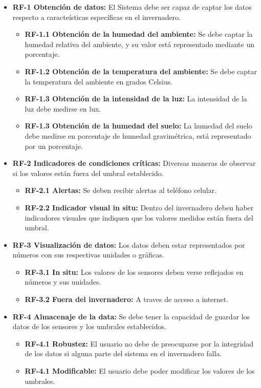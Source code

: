 \begin{itemize}
    \item \textbf{RF-1 Obtención de datos:} El Sistema debe ser capaz de captar los datos respecto a caracteísticas específicas en el invernadero.
    \begin{itemize}
        \item \textbf{RF-1.1 Obtención de la humedad del ambiente:} Se debe captar la humedad relativa del ambiente, y su valor está representado mediante un porcentaje. 
        \item \textbf{RF-1.2 Obtención de la temperatura del ambiente:} Se debe captar la temperatura del ambiente en grados Celsius. 
        \item \textbf{RF-1.3 Obtención de la intensidad de la luz:} La intensidad de la luz debe medirse en lux.
        \item \textbf{RF-1.3 Obtención de la humedad del suelo:} La humedad del suelo debe medirse en porcentaje de humedad gravimétrica, está representado por un porcentaje.
    \end{itemize}

    \item \textbf{RF-2 Indicadores de condiciones críticas:} Diversas maneras de observar si los valores están fuera del umbral establecido.
    \begin{itemize}
        \item \textbf{RF-2.1 Alertas:} Se deben recibir alertas al teléfono celular.
        \item \textbf{RF-2.2 Indicador visual in situ:} Dentro del invernadero deben haber indicadores visuales que indiquen que los valores medidos están fuera del umbral.
    \end{itemize}   

    \item \textbf{RF-3 Visualización de datos:} Los datos deben estar representados por números con sus respectivas unidades o gráficas.
    \begin{itemize}
        \item \textbf{RF-3.1 In situ:} Los valores de los sensores deben verse reflejados en números y sus unidades.
        \item \textbf{RF-3.2 Fuera del invernadero:} A traves de acceso a internet.
    \end{itemize}   

    \item \textbf{RF-4 Almacenaje de la data:} Se debe tener la capacidad de guardar los datos de los sensores y los umbrales establecidos.
    \begin{itemize}
        \item \textbf{RF-4.1 Robustez:} El usuario no debe de preocuparse por la integridad de los datos si alguna parte del sistema en el invernadero falla.
        \item \textbf{RF-4.1 Modificable:} El usuario debe poder modificar los valores de los umbrales. 
    \end{itemize}


\end{itemize}
